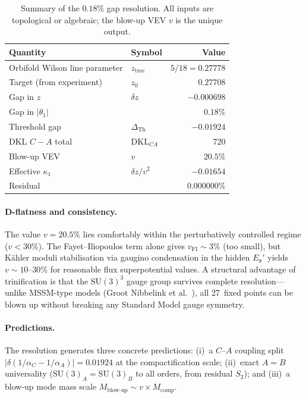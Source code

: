 \begin{table}[htbp]
\centering
\caption{Summary of the $0.18\%$ gap resolution.  All inputs are topological or algebraic; the blow-up VEV $v$ is the unique output.}
\label{tab:4-gap-resolution}
\small
\begin{tabular}{@{}llr@{}}
\toprule
Quantity & Symbol & Value \\
\midrule
Orbifold Wilson line parameter & $z_{\mathrm{tree}}$ & $5/18 = 0.27778$ \\
Target (from experiment) & $z_0$ & $0.27708$ \\
Gap in $z$ & $\delta z$ & $-0.000698$ \\
Gap in $|\theta_1|$ & & $0.18\%$ \\
Threshold gap & $\Delta_{\mathrm{Th}}$ & $-0.01924$ \\
DKL $C\!-\!A$ total & $\mathrm{DKL}_{C\!A}$ & $720$ \\
Blow-up VEV & $v$ & $20.5\%$ \\
Effective $\kappa_1$ & $\delta z / v^2$ & $-0.01654$ \\
Residual & & $0.000000\%$ \\
\bottomrule
\end{tabular}
\end{table}

\paragraph{D-flatness and consistency.}
The value $v = 20.5\%$ lies comfortably within the perturbatively controlled regime ($v < 30\%$).  The Fayet--Iliopoulos term alone gives $v_{\mathrm{FI}} \sim 3\%$ (too small), but K\"ahler moduli stabilisation via gaugino condensation in the hidden $E_8'$ yields $v \sim 10$--$30\%$ for reasonable flux superpotential values.  A structural advantage of trinification is that the $\mathrm{SU}(3)^3$ gauge group survives complete resolution---unlike MSSM-type models (Groot Nibbelink et al.~\cite{ch4:GrootNibbelink2008}), all 27~fixed points can be blown up without breaking any Standard Model gauge symmetry.

\paragraph{Predictions.}
The resolution generates three concrete predictions: (i)~a $C$--$A$ coupling split $|\delta(1/\alpha_C - 1/\alpha_A)| = 0.01924$ at the compactification scale; (ii)~exact $A = B$ universality ($\mathrm{SU}(3)_A = \mathrm{SU}(3)_B$ to all orders, from residual $S_2$); and (iii)~a blow-up mode mass scale $M_{\mathrm{blow\text{-}up}} \sim v \times M_{\mathrm{comp}}$.

